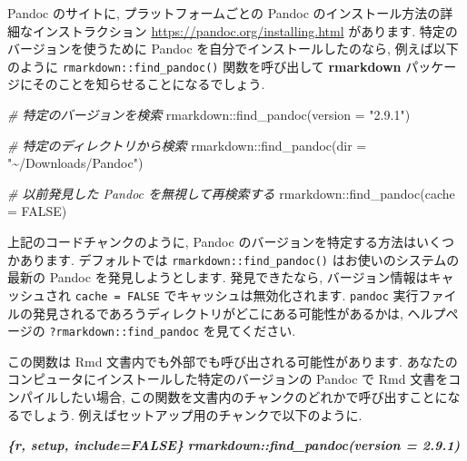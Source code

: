 \documentclass[
  11pt,
  lualatex,
  ja=standard]{bxjsreport}
\newenvironment{Shaded}{\begin{snugshade}}{\end{snugshade}}
\newcommand{\AttributeTok}[1]{\textcolor[rgb]{0.77,0.63,0.00}{#1}}
\newcommand{\CommentTok}[1]{\textcolor[rgb]{0.56,0.35,0.01}{\textit{#1}}}
\newcommand{\ConstantTok}[1]{\textcolor[rgb]{0.00,0.00,0.00}{#1}}
\newcommand{\FunctionTok}[1]{\textcolor[rgb]{0.00,0.00,0.00}{#1}}
\newcommand{\InformationTok}[1]{\textcolor[rgb]{0.56,0.35,0.01}{\textbf{\textit{#1}}}}
\newcommand{\NormalTok}[1]{#1}
\newcommand{\SpecialCharTok}[1]{\textcolor[rgb]{0.00,0.00,0.00}{#1}}
\newcommand{\StringTok}[1]{\textcolor[rgb]{0.31,0.60,0.02}{#1}}
\begin{document}
Pandoc のサイトに, プラットフォームごとの Pandoc のインストール方法の詳細なインストラクション \url{https://pandoc.org/installing.html} があります. 特定のバージョンを使うために Pandoc を自分でインストールしたのなら, 例えば以下のように \texttt{rmarkdown::find\_pandoc()} 関数を呼び出して \textbf{rmarkdown} パッケージにそのことを知らせることになるでしょう.

\begin{Shaded}
\begin{Highlighting}[numbers=left,,]
\CommentTok{\# 特定のバージョンを検索}
\NormalTok{rmarkdown}\SpecialCharTok{::}\FunctionTok{find\_pandoc}\NormalTok{(}\AttributeTok{version =} \StringTok{"2.9.1"}\NormalTok{)}

\CommentTok{\# 特定のディレクトリから検索}
\NormalTok{rmarkdown}\SpecialCharTok{::}\FunctionTok{find\_pandoc}\NormalTok{(}\AttributeTok{dir =} \StringTok{"\textasciitilde{}/Downloads/Pandoc"}\NormalTok{)}

\CommentTok{\# 以前発見した Pandoc を無視して再検索する}
\NormalTok{rmarkdown}\SpecialCharTok{::}\FunctionTok{find\_pandoc}\NormalTok{(}\AttributeTok{cache =} \ConstantTok{FALSE}\NormalTok{)}
\end{Highlighting}
\end{Shaded}

上記のコードチャンクのように, Pandoc のバージョンを特定する方法はいくつかあります. デフォルトでは \texttt{rmarkdown::find\_pandoc()} はお使いのシステムの最新の Pandoc を発見しようとします. 発見できたなら, バージョン情報はキャッシュされ \texttt{cache = FALSE} でキャッシュは無効化されます. \texttt{pandoc} 実行ファイルの発見されるであろうディレクトリがどこにある可能性があるかは, ヘルプページの \texttt{?rmarkdown::find\_pandoc} を見てください.

この関数は Rmd 文書内でも外部でも呼び出される可能性があります. あなたのコンピュータにインストールした特定のバージョンの Pandoc で Rmd 文書をコンパイルしたい場合, この関数を文書内のチャンクのどれかで呼び出すことになるでしょう. 例えばセットアップ用のチャンクで以下のように.

\begin{Shaded}
\begin{Highlighting}[]
\InformationTok{\textasciigrave{}\textasciigrave{}\textasciigrave{}\{r, setup, include=FALSE\}}
\InformationTok{rmarkdown::find\_pandoc(version = \textquotesingle{}2.9.1\textquotesingle{})}
\InformationTok{\textasciigrave{}\textasciigrave{}\textasciigrave{}}
\end{Highlighting}
\end{Shaded}
\end{document}
